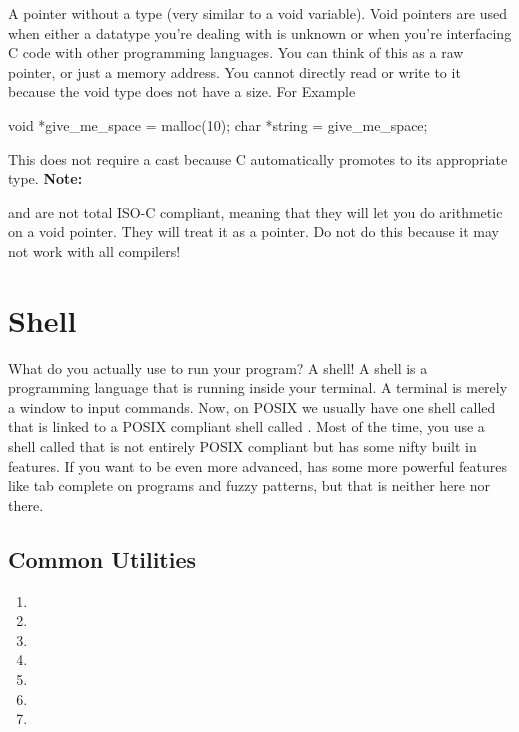 A pointer without a type (very similar to a void variable). Void pointers are used when either a datatype you're dealing with is unknown or when you're interfacing C code with other programming languages. You can think of this as a raw pointer, or just a memory address. You cannot directly read or write to it because the void type does not have a size. For Example

\begin{code}[language=C]
void *give_me_space = malloc(10);
char *string = give_me_space;
\end{code}

This does not require a cast because C automatically promotes  to its appropriate type. \textbf{Note:}

 and  are not total ISO-C compliant, meaning that they will let you do arithmetic on a void pointer. They will treat it as a  pointer. Do not do this because it may not work with all compilers!

\section{Shell}

What do you actually use to run your program? A shell! A shell is a programming language that is running inside your terminal. A terminal is merely a window to input commands. Now, on POSIX we usually have one shell called  that is linked to a POSIX compliant shell called . Most of the time, you use a shell called  that is not entirely POSIX compliant but has some nifty built in features. If you want to be even more advanced,  has some more powerful features like tab complete on programs and fuzzy patterns, but that is neither here nor there. 

\subsection{Common Utilities}

\begin{enumerate}
\item {}
\item {}
\item {}
\item {}
\item {}
\item {}
\item {}
\end{enumerate}

